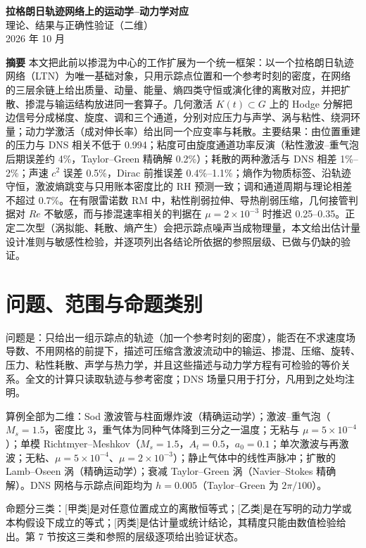 \documentclass[11pt,a4paper]{article}
\newcommand{\jia}{[甲类]}\newcommand{\yi}{[乙类]}\newcommand{\bing}{[丙类]}
\begin{document}
\begin{center}
{\sffamily\LARGE\bfseries 拉格朗日轨迹网络上的运动学–动力学对应}\\[4pt]
{\sffamily\large 理论、结果与正确性验证（二维）}\\[8pt]
{\small 2026 年 10 月}
\end{center}

\noindent\textbf{摘要}\quad
本文把此前以掺混为中心的工作扩展为一个统一框架：以一个拉格朗日轨迹网络（LTN）为唯一基础对象，只用示踪点位置和一个参考时刻的密度，在网络的三层余链上给出质量、动量、能量、熵四类守恒或演化律的离散对应，并把扩散、掺混与输运结构放进同一套算子。几何激活 $K(t)\subset G$ 上的 Hodge 分解把边信号分成梯度、旋度、调和三个通道，分别对应压力与声学、涡与粘性、绕洞环量；动力学激活（成对伸长率）给出同一个应变率与耗散。主要结果：由位置重建的压力与 DNS 相关不低于 0.994；粘度可由旋度通道功率反演（粘性激波–重气泡后期误差约 4\%，Taylor–Green 精确解 0.2\%）；耗散的两种激活与 DNS 相差 1\%–2\%；声速 $c^2$ 误差 0.5\%，Dirac 前推误差 0.4\%–1.1\%；熵作为物质标签、沿轨迹守恒，激波熵跳变与只用账本密度比的 RH 预测一致；调和通道周期与理论相差不超过 0.7\%。在有限雷诺数 RM 中，粘性削弱拉伸、导热削弱压缩，几何接管判据对 $Re$ 不敏感，而与掺混速率相关的判据在 $\mu=2\times10^{-3}$ 时推迟 0.25–0.35。正定二次型（涡拟能、耗散、熵产生）会把示踪点噪声当成物理量，本文给出估计量设计准则与敏感性检验，并逐项列出各结论所依据的参照层级、已做与仍缺的验证。

\tableofcontents
\newpage

\section{问题、范围与命题类别}
问题是：只给出一组示踪点的轨迹（加一个参考时刻的密度），能否在不求速度场导数、不用网格的前提下，描述可压缩含激波流动中的输运、掺混、压缩、旋转、压力、粘性耗散、声学与热力学，并且这些描述与动力学方程有可检验的等价关系。全文的计算只读取轨迹与参考密度；DNS 场量只用于打分，凡用到之处均注明。

算例全部为二维：Sod 激波管与柱面爆炸波（精确运动学）；激波–重气泡（$M_s=1.5$，密度比 3，重气体为同种气体降到三分之一温度；无粘与 $\mu=5\times10^{-4}$）；单模 Richtmyer–Meshkov（$M_s=1.5$，$A_t=0.5$，$a_0=0.1$；单次激波与再激波；无粘、$\mu=5\times10^{-4}$、$\mu=2\times10^{-3}$）；静止气体中的线性声脉冲；扩散的 Lamb–Oseen 涡（精确运动学）；衰减 Taylor–Green 涡（Navier–Stokes 精确解）。DNS 网格与示踪点间距均为 $h=0.005$（Taylor–Green 为 $2\pi/100$）。

命题分三类：\jia 是对任意位置成立的离散恒等式；\yi 是在写明的动力学或本构假设下成立的等式；\bing 是估计量或统计结论，其精度只能由数值检验给出。第 7 节按这三类和参照的层级逐项给出验证状态。
\end{document}
